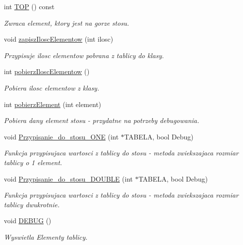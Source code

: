 \begin{DoxyCompactItemize}
int \hyperlink{class_s_t_o_s_a4d438b183b8bf5fb6f39f815f16428c5}{T\+O\+P} () const 
\begin{DoxyCompactList}\small\item\em Zwraca element, ktory jest na gorze stosu. \end{DoxyCompactList}\item 
void \hyperlink{class_s_t_o_s_a2a6c80cfe33035a64a0555441e57edc0}{zapisz\+Ilosc\+Elementow} (int ilosc)
\begin{DoxyCompactList}\small\item\em Przypisuje ilosc elementow pobrana z tablicy do klasy. \end{DoxyCompactList}\item 
int \hyperlink{class_s_t_o_s_a667fc0ec322ce0bffc873e3582addbb6}{pobierz\+Ilosc\+Elementow} ()
\begin{DoxyCompactList}\small\item\em Pobiera ilosc elementow z klasy. \end{DoxyCompactList}\item 
int \hyperlink{class_s_t_o_s_abf9fcfa1af449949eb4c6c41a32a332d}{pobierz\+Element} (int element)
\begin{DoxyCompactList}\small\item\em Pobiera dany element stosu -\/ przydatne na potrzeby debugowania. \end{DoxyCompactList}\item 
void \hyperlink{class_s_t_o_s_adaa5547afa29b2f401e85dc03fee62ea}{Przypisanie\+\_\+do\+\_\+stosu\+\_\+\+O\+N\+E} (int $\ast$T\+A\+B\+E\+L\+A, bool Debug)
\begin{DoxyCompactList}\small\item\em Funkcja przypisujaca wartosci z tablicy do stosu -\/ metoda zwiekszajaca rozmiar tablicy o 1 element. \end{DoxyCompactList}\item 
void \hyperlink{class_s_t_o_s_a78fc5561773862378f028ef23cba57f8}{Przypisanie\+\_\+do\+\_\+stosu\+\_\+\+D\+O\+U\+B\+L\+E} (int $\ast$T\+A\+B\+E\+L\+A, bool Debug)
\begin{DoxyCompactList}\small\item\em Funkcja przypisujaca wartosci z tablicy do stosu -\/ metoda zwiekszajaca rozmiar tablicy dwukrotnie. \end{DoxyCompactList}\item 
void \hyperlink{class_s_t_o_s_a94fa2862b099635b5ab2aa30b17736c3}{D\+E\+B\+U\+G} ()
\begin{DoxyCompactList}\small\item\em Wyswietla Elementy tablicy. \end{DoxyCompactList}\end{DoxyCompactItemize}


